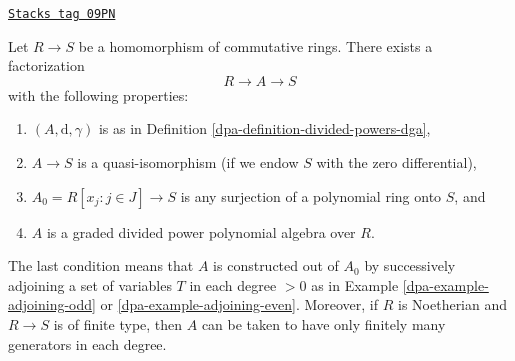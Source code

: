 \begin{lemma}
\label{dpa-lemma-tate-resolution}
\href{https://stacks.math.columbia.edu/tag/09PN}{\texttt{Stacks tag 09PN}}

Let $R \to S$ be a homomorphism of commutative rings.
There exists a factorization
$$
R \to A \to S
$$
with the following properties:
\begin{enumerate}
\item $(A, \text{d}, \gamma)$ is as in
Definition \ref{dpa-definition-divided-powers-dga},
\item $A \to S$ is a quasi-isomorphism (if we endow $S$ with
the zero differential),
\item $A_0 = R[x_j: j\in J] \to S$ is any surjection of a polynomial
ring onto $S$, and
\item $A$ is a graded divided power polynomial algebra over $R$.
\end{enumerate}
The last condition means that $A$ is constructed out of $A_0$ by
successively adjoining a set of variables $T$ in each degree $> 0$ as in
Example \ref{dpa-example-adjoining-odd} or \ref{dpa-example-adjoining-even}.
Moreover, if $R$ is Noetherian and $R\to S$ is of finite type,
then $A$ can be taken to have only finitely many generators in
each degree.
\end{lemma}


